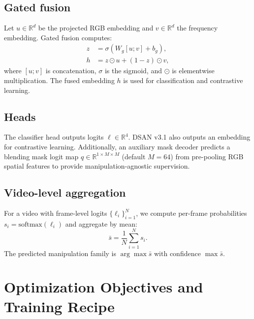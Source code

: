 \documentclass[conference]{IEEEtran}
\begin{document}
\subsection{Gated fusion}
Let $u \in \mathbb{R}^{d}$ be the projected RGB embedding and $v \in \mathbb{R}^{d}$ the frequency embedding. Gated fusion computes:
\begin{align}
z &= \sigma(W_g [u;v] + b_g),\\
h &= z \odot u + (1-z)\odot v,
\end{align}
where $[u;v]$ is concatenation, $\sigma$ is the sigmoid, and $\odot$ is elementwise multiplication. The fused embedding $h$ is used for classification and contrastive learning.

\subsection{Heads}
The classifier head outputs logits $\ell \in \mathbb{R}^{4}$. DSAN v3.1 also outputs an embedding for contrastive learning. Additionally, an auxiliary mask decoder predicts a blending mask logit map $q \in \mathbb{R}^{1\times M\times M}$ (default $M=64$) from pre-pooling RGB spatial features to provide manipulation-agnostic supervision.

\subsection{Video-level aggregation}
For a video with frame-level logits $\{\ell_i\}_{i=1}^{N}$, we compute per-frame probabilities $s_i=\mathrm{softmax}(\ell_i)$ and aggregate by mean:
\begin{equation}
\bar{s} = \frac{1}{N}\sum_{i=1}^{N} s_i.
\end{equation}
The predicted manipulation family is $\arg\max \bar{s}$ with confidence $\max \bar{s}$.

\section{Optimization Objectives and Training Recipe}
\end{document}
